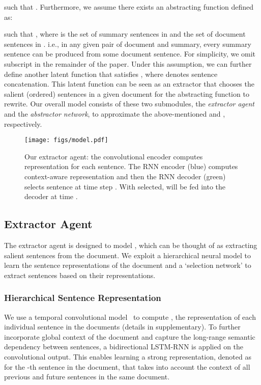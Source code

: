 \documentclass[11pt,a4paper]{article}
\begin{document}
such that .
Furthermore, we assume there exists an abstracting function  defined as:

such that ,
where  is the set of summary sentences in  and
 the set of document sentences in .
i.e., in any given pair of document and summary, every summary sentence can be produced from some document sentence.
For simplicity, we omit subscript  in the remainder of the paper.
Under this assumption, we can further define another latent function
 that satisfies
,
where  denotes sentence concatenation.
This latent function  can be seen as an extractor that chooses the salient (ordered) sentences in a given document for the abstracting function  to rewrite.
Our overall model consists of these two submodules,
the \textit{extractor agent} and the \textit{abstractor network},
to approximate the above-mentioned  and , respectively.


\begin{figure*}
 \centering
 \texttt{[image: figs/model.pdf]}
 \vspace{-0.3cm}
 \caption{Our extractor agent: the convolutional encoder computes representation  for each sentence. The RNN encoder (blue) computes context-aware representation  and then the RNN decoder (green) selects sentence  at time step . With  selected,  will be fed into the decoder at time . 
 }
 \vspace{-0.2cm}
 \label{fig:model}
\end{figure*}



\subsection{Extractor Agent}
The extractor agent is designed to model , which can be thought of as extracting salient sentences from the document.
We exploit a hierarchical neural model to learn the sentence representations of the document and a `selection network' to extract sentences based on their representations.


\subsubsection{Hierarchical Sentence Representation}
\label{sec:sent-rep}
We use a temporal convolutional model~\cite{kim:2014:EMNLP2014} to compute , the representation of 
each individual sentence in the documents (details in supplementary). 
To further incorporate global context of the document and capture the long-range semantic dependency between sentences, 
a bidirectional LSTM-RNN \citep{Hochreiter:1997:LSM:265493.264179,Schuster97bidirectionalrecurrent}
is applied on the convolutional output.
This enables learning a strong representation,
denoted as  for the -th sentence in the document, that takes into account the context of all previous and future sentences in the same document.
\end{document}

